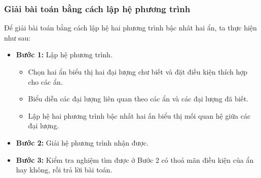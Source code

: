 \begin{tomtat}
\subsubsection{Giải bài toán bằng cách lập hệ phương trình}
\begin{boxdn}
	Để giải bài toán bằng cách lập hệ hai phương trình bậc nhât hai ẩn, ta thực hiện như sau:
	\begin{itemize}
	\item \textbf{Bước 1:} Lập hệ phương trình.
		\begin{itemize}
		\item Chọn hai ẩn biểu thị hai đại lượng chư biết và đặt điều kiện thích hợp cho các ẩn.
		\item Biểu diễn các đại lượng liên quan theo các ẩn và các đại lượng đã biết.
		\item Lập hệ hai phương trình bậc nhất hai ấn biểu thị mối quan hệ giữa các đại lượng.
		\end{itemize}
	\item \textbf{Bước 2:} Giải hệ phương trình nhận được.
	\item \textbf{Bước 3:} Kiểm tra nghiệm tìm được ở Bước 2 có thoả mãn điều kiện của ẩn hay không, rồi trả lời bài toán.
	\end{itemize}
\end{boxdn}
\end{tomtat}
